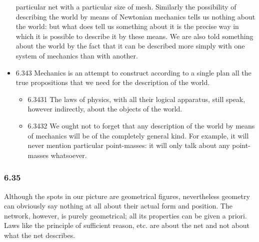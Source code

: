\documentclass[11pt]{article}
\begin{document}
\begin{itemize}
particular net with a particular size of mesh. Similarly the possibility of
describing the world by means of Newtonian mechanics tells us nothing about
the world: but what does tell us something about it is the precise way in
which it is possible to describe it by these means. We are also told
something about the world by the fact that it can be described more simply
with one system of mechanics than with another.
\item 6.343
\label{sec:org3a92385}
Mechanics is an attempt to construct according to a single plan all
the true propositions that we need for the description of the world.
\begin{itemize}
\item 6.3431
\label{sec:org6e19f3f}
The laws of physics, with all their logical apparatus, still speak,
however indirectly, about the objects of the world.
\item 6.3432
\label{sec:orgbfda09b}
We ought not to forget that any description of the world by means of
mechanics will be of the completely general kind. For example, it will
never mention particular point-masses: it will only talk about any point-
masses whatsoever.
\end{itemize}
\end{itemize}
\subsubsection*{6.35}
\label{sec:org5078e97}
Although the spots in our picture are geometrical figures,
nevertheless geometry can obviously say nothing at all about their actual
form and position. The network, however, is purely geometrical; all its
properties can be given a priori. Laws like the principle of sufficient
reason, etc. are about the net and not about what the net describes.
\end{document}
